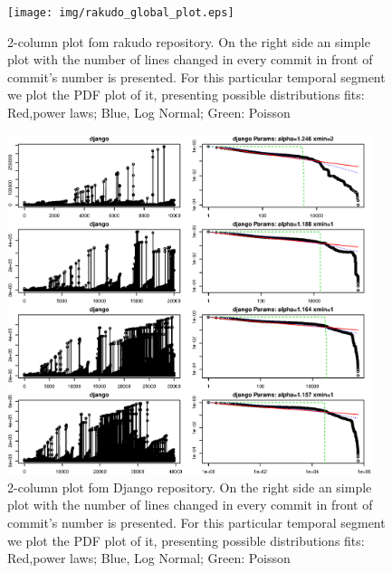 \documentclass[conference]{IEEEtran}
\begin{document}
\begin{figure}[htbp]
	\centerline{\texttt{[image: img/rakudo\_global\_plot.eps]}}
	\caption{2-column plot fom rakudo repository. On the right side an simple plot with the number of lines changed in every commit in front of commit's number is presented. For this particular temporal segment we plot the PDF plot of it, presenting possible distributions fits: Red,power laws; Blue, Log Normal; Green: Poisson}
	\label{fig:rakudo}
\end{figure}

\begin{figure}[htbp]
	\centerline{\includegraphics[width=0.95\textwidth]{img/django_global_set.eps}}
	\caption{2-column plot fom Django repository. On the right side an simple plot with the number of lines changed in every commit in front of commit's number is presented. For this particular temporal segment we plot the PDF plot of it, presenting possible distributions fits: Red,power laws; Blue, Log Normal; Green: Poisson }
	\label{fig:django}
\end{figure}
\end{document}
